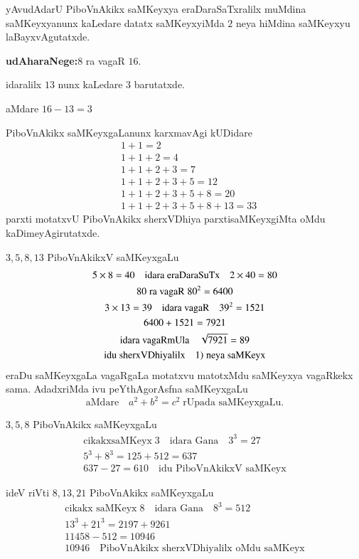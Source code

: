 yAvudAdarU PiboVnAkikx saMKeyxya eraDaraSaTxralilx muMdina saMKeyxyanunx kaLedare datatx saMKeyxyiMda $2$ neya hiMdina saMKeyxyu laBayxvAgutatxde.

\textbf{udAharaNege:}\quad $8$ ra vagaR $16$.

idaralilx $13$ nunx  kaLedare $3$ barutatxde.

aMdare $16-13 =3$

PiboVnAkikx saMKeyxgaLanunx karxmavAgi kUDidare
\begin{align*}
&1+1=2\\
&1+1+2=4\\
&1+1+2+3=7\\
&1+1+2+3+5=12\\
&1+1+2+3+5+8=20\\
&1+1+2+3+5+8+13=33
\end{align*}
parxti motatxvU PiboVnAkikx sherxVDhiya parxtisaMKeyxgiMta oMdu kaDimeyAgirutatxde.

$3,5,8,13$ PiboVnAkikxV saMKeyxgaLu
\begin{gather*}
5\times 8 =40 \quad \text{idara eraDaraSuTx} \quad 2\times 40 = 80\\
80 \;\text{ra vagaR}\; 80^2 = 6400\\
3\times 13 =39 \quad \text{idara vagaR} \quad 39^2 = 1521\\
6400+1521 = 7921 \\
\text{idara vagaRmUla} \quad\sqrt{7921} =89\\
\text{idu sherxVDhiyalilx}\quad {\rm 1)}\;\text{neya saMKeyx} 
\end{gather*}
eraDu saMKeyxgaLa vagaRgaLa motatxvu matotxMdu saMKeyxya vagaRkekx sama. AdadxriMda ivu peYthAgorAsfna saMKeyxgaLu
$$
\text{aMdare}\quad a^2+b^2=c^2 \;\text{rUpada saMKeyxgaLu.}
$$

$3,5,8$ PiboVnAkikx saMKeyxgaLu
\begin{gather*}
\text{cikakxsaMKeyx}\; 3 \quad \text{idara Gana} \quad 3^3 = 27\\
5^{3}+8^{3} = 125+512 = 637\\
637-27 = 610 \quad\text{idu PiboVnAkikxV saMKeyx}
\end{gather*}

ideV riVti $8,13,21$ PiboVnAkikx saMKeyxgaLu
\begin{gather*}
\text{cikakx saMKeyx}\;8 \quad \text{idara Gana} \quad 8^3=512\\
13^3+21^3 = 2197+9261\\
11458-512 = 10946\\
10946 \quad\text{PiboVnAkikx sherxVDhiyalilx oMdu saMKeyx} 
\end{gather*}

